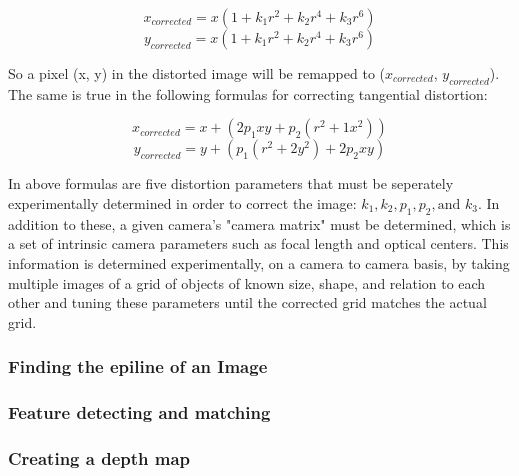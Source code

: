 $$x_{corrected} = x(1+k_1 r^2 + k_2 r^4 + k_3 r^6)$$
$$y_{corrected} = x(1+k_1 r^2 + k_2 r^4 + k_3 r^6)$$

So a pixel (x, y) in the distorted image will be remapped to ($x_{corrected}$, $y_{corrected}$). The same is true in the following formulas for correcting tangential distortion:

$$x_{corrected} = x + (2p_1 x y + p_2(r^2 + 1x^2))$$
$$y_{corrected} = y + (p_1(r^2 + 2y^2) + 2p_2 x y)$$

In above formulas are five distortion parameters that must be seperately experimentally determined in order to correct the image: $k_1, k_2, p_1, p_2,\text{and } k_3$. In addition to these, a given camera's "camera matrix" must be determined, which is a set of intrinsic camera parameters such as focal length and optical centers. This information is determined experimentally, on a camera to camera basis, by taking multiple images of a grid of objects of known size, shape, and relation to each other and tuning these parameters until the corrected grid matches the actual grid.
\subsubsection{Finding the epiline of an Image}
\subsubsection{Feature detecting and matching}
\subsubsection{Creating a depth map}